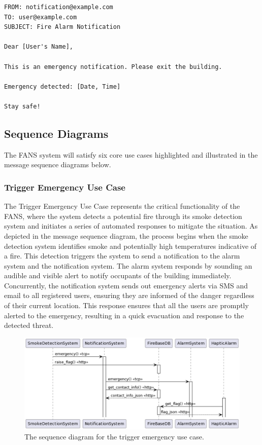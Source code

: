 {
\tiny
\begin{lstlisting}[label={lst:email},caption={Email notification for detected emergency in FANS.}]
FROM: notification@example.com
TO: user@example.com
SUBJECT: Fire Alarm Notification

Dear [User's Name],

This is an emergency notification. Please exit the building.

Emergency detected: [Date, Time]

Stay safe!
\end{lstlisting}
}

\subsection{Sequence Diagrams}

The FANS system will satisfy six core use cases highlighted and illustrated in the message sequence diagrams below.

\subsubsection{Trigger Emergency Use Case}

The Trigger Emergency Use Case represents the critical functionality of the FANS, where the system detects a potential
fire through its smoke detection system and initiates a series of automated responses to mitigate the situation. As
depicted in the message sequence diagram, the process begins when the smoke detection system identifies smoke and
potentially high temperatures indicative of a fire. This detection triggers the system to send a notification to the
alarm system and the notification system. The alarm system responds by sounding an audible and visible alert to notify
occupants of the building immediately. Concurrently, the notification system sends out emergency alerts via SMS and
email to all registered users, ensuring they are informed of the danger regardless of their current location. This
response ensures that all the users are promptly alerted to the emergency, resulting in a quick evacuation and response
to the detected threat.

\begin{figure}[H]
    \centering
    \includegraphics[width=\imagewidth]{../assets/sequence/TriggerEmergencyUseCaseSequenceDiagram.png}
    \caption{The sequence diagram for the trigger emergency use case.}
\end{figure}

